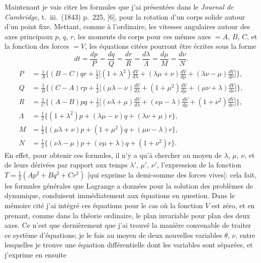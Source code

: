 \documentclass[11pt]{article}
\begin{document}
\smallskip
Maintenant je vais citer les formules que j'ai pr\'esent\'ees dans le \textit{Journal de
Cambridge}, t.~iii.\ (1843) p.~225, [6], pour la rotation d'un corps solide autour d'un point fixe.
Mettant, comme \`a l'ordinaire, les vitesses angulaires autour des axes principaux $p$, $q$, $r$,
les moments du corps pour ces m\^emes axes $= A$, $B$, $C$, et la fonction des forces $= V$,
les \'equations cit\'ees pourront \^etre \'ecrites sous la forme
\[
dt = \frac{dp}{P} = \frac{dq}{Q} = \frac{dr}{R} = \frac{d\lambda}{\Lambda} = \frac{d\mu}{M} = \frac{d\nu}{N} \tag{26}.
\]
\[
\begin{aligned}
P &= \tfrac{1}{A}\Big\{(B - C)qr + \tfrac{1}{2}\big[(1 + \lambda^{2})\tfrac{dV}{d\lambda} + (\lambda\mu + \nu)\tfrac{dV}{d\mu} + (\lambda\nu - \mu)\tfrac{dV}{d\nu}\big]\Big\},\\
Q &= \tfrac{1}{B}\Big\{(C - A)rp + \tfrac{1}{2}\big[(\mu\lambda - \nu)\tfrac{dV}{d\lambda} + (1 + \mu^{2})\tfrac{dV}{d\mu} + (\mu\nu + \lambda)\tfrac{dV}{d\nu}\big]\Big\},\\
R &= \tfrac{1}{C}\Big\{(A - B)pq + \tfrac{1}{2}\big[(\nu\lambda + \mu)\tfrac{dV}{d\lambda} + (\nu\mu - \lambda)\tfrac{dV}{d\mu} + (1 + \nu^{2})\tfrac{dV}{d\nu}\big]\Big\},\\
\Lambda &= \tfrac{1}{2}\{(1 + \lambda^{2})p + (\lambda\mu - \nu)q + (\lambda\nu + \mu)r\},\\
M &= \tfrac{1}{2}\{(\mu\lambda + \nu)p + (1 + \mu^{2})q + (\mu\nu - \lambda)r\},\\
N &= \tfrac{1}{2}\{(\nu\lambda - \mu)p + (\nu\mu + \lambda)q + (1 + \nu^{2})r\}.
\end{aligned}
\tag{27}
\]
En effet, pour obtenir ces formules, il n'y a qu'\`a chercher au moyen de $\lambda$, $\mu$, $\nu$,
et de leurs d\'eriv\'ees par rapport aux temps $\lambda'$, $\mu'$, $\nu'$, l'expression de la fonction
$T = \tfrac{1}{2}(A p^{2} + B q^{2} + C r^{2})$ [qui exprime la demi-somme des forces vives]: cela fait, les
formules g\'en\'erales que Lagrange a donn\'ees pour la solution des probl\`emes de dynamique,
conduisent imm\'ediatement aux \'equations en question. Dans le m\'emoire cit\'e j'ai
int\'egr\'e ces \'equations pour le cas o\`u la fonction $V$ est z\'ero, et en prenant, comme
dans la th\'eorie ordinaire, le plan invariable pour plan des deux axes. Ce n'est que
derni\`erement que j'ai trouv\'e la mani\`ere convenable de traiter ce syst\`eme d'\'equations;
je le fais au moyen de deux nouvelles variables $\theta$, $\nu$, entre lesquelles je trouve une
\'equation diff\'erentielle dont les variables sont s\'epar\'ees, et j'exprime en ensuite
\end{document}
